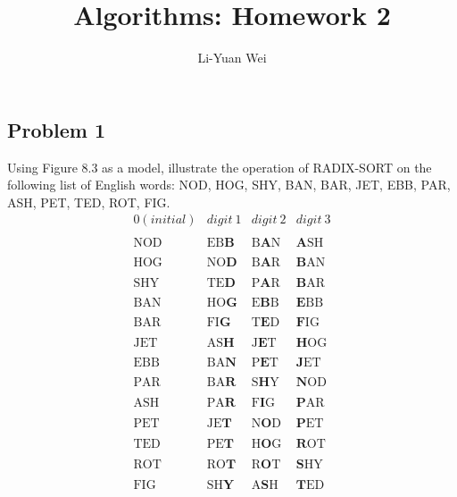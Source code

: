 \documentclass[a4paper]{article}
\begin{document}
\title{Algorithms: Homework 2}
\author{Li-Yuan Wei}
\date{}
\maketitle

\subsection*{Problem 1}
Using Figure 8.3 as a model, illustrate the operation of RADIX-SORT on the following list of English words: NOD, HOG, SHY, BAN, BAR, JET, EBB, PAR, ASH, PET, TED, ROT, FIG.
$$
\begin{array}{cccc}
0(initial)& digit\ 1 & digit\ 2 & digit\ 3 \\\\
\hline
\text{NOD} & \text{EB$\textbf{B}$} & \text{B$\textbf{A}$N} & \text{$\textbf{A}$SH} \\\\
\text{HOG} & \text{NO$\textbf{D}$} & \text{B$\textbf{A}$R} & \text{$\textbf{B}$AN} \\\\
\text{SHY} & \text{TE$\textbf{D}$} & \text{P$\textbf{A}$R} & \text{$\textbf{B}$AR} \\\\
\text{BAN} & \text{HO$\textbf{G}$} & \text{E$\textbf{B}$B} & \text{$\textbf{E}$BB} \\\\
\text{BAR} & \text{FI$\textbf{G}$} & \text{T$\textbf{E}$D} & \text{$\textbf{F}$IG} \\\\
\text{JET} & \text{AS$\textbf{H}$} & \text{J$\textbf{E}$T} & \text{$\textbf{H}$OG} \\\\
\text{EBB} & \text{BA$\textbf{N}$} & \text{P$\textbf{E}$T} & \text{$\textbf{J}$ET} \\\\
\text{PAR} & \text{BA$\textbf{R}$} & \text{S$\textbf{H}$Y} & \text{$\textbf{N}$OD} \\\\
\text{ASH} & \text{PA$\textbf{R}$} & \text{F$\textbf{I}$G} & \text{$\textbf{P}$AR} \\\\
\text{PET} & \text{JE$\textbf{T}$} & \text{N$\textbf{O}$D} & \text{$\textbf{P}$ET} \\\\
\text{TED} & \text{PE$\textbf{T}$} & \text{H$\textbf{O}$G} & \text{$\textbf{R}$OT} \\\\
\text{ROT} & \text{RO$\textbf{T}$} & \text{R$\textbf{O}$T} & \text{$\textbf{S}$HY} \\\\
\text{FIG} & \text{SH$\textbf{Y}$} & \text{A$\textbf{S}$H} & \text{$\textbf{T}$ED} \\\\
\end{array}
$$
\end{document}
